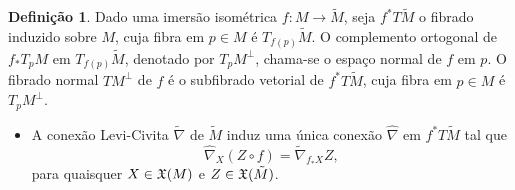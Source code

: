 \documentclass[12pt,a4paper]{beamer}
\theoremstyle{definition}
\newtheorem{definicao}{Definição}
\begin{document}
\begin{frame}

	\begin{definicao}
		Dado uma imersão isométrica $f: M \rightarrow \tilde{M}$, seja $f^* T\tilde{M}$ o \alert{fibrado induzido} sobre $M$, cuja fibra em $p \in M$ é $T_{f(p)} \tilde{M}$. O complemento ortogonal de $f_* T_p M$ em $T_{f(p)} \tilde{M}$, denotado por $T_p M^\perp$, chama-se o \alert{espaço normal} de $f$ em $p$. O \alert{fibrado normal} $TM^\perp$ de $f$ é o subfibrado vetorial de $f^* T \tilde{M}$, cuja fibra em $p \in M$ é $T_p M^\perp$.  
	\end{definicao}

	\begin{itemize}
		\pause
		\item 	A conexão Levi-Civita $\tilde{\nabla}$ de $\tilde{M}$ induz uma única conexão $\hat{\nabla}$ em $f^* T \tilde{M}$ tal que
		\begin{equation*}
		\hat{\nabla}_X (Z \circ f) = \tilde{\nabla}_{f_* X} Z, 
		\end{equation*}
		para quaisquer $X \in \mathfrak{X}(M)$ e $Z \in \mathfrak{X}(\tilde{M})$.
	\end{itemize}
	
\end{frame}
\end{document}
